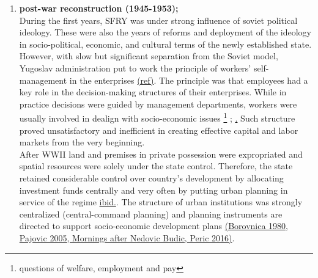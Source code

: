 \documentclass[11pt]{report}
\begin{document}
\begin{enumerate}

\item  \textbf{post-war reconstruction (1945-1953);}
\\
During the first years, SFRY was under strong influence of soviet political ideology. These were also the years of reforms and deployment of the ideology in socio-political, economic, and cultural terms of the newly established state. However, with slow but significant separation from the Soviet model, Yugoslav administration put to work the principle of workers' self-management in the enterprises \href{}{(ref)}. The principle was that employees  had  a  key  role  in  the  decision-making structures  of  their enterprises. While in practice decisions  were  guided  by  management departments,  workers were usually involved in dealign with socio-economic issues
\footnote{questions of welfare, employment and pay} \href{}{\citealt{estrin_yugoslavia:_1991}}; \href{Lydall,  1984}. Such structure proved unsatisfactory and inefficient in creating effective capital  and  labor  markets from the very beginning.
\\

After WWII land and premises in private possession were expropriated and spatial resources were solely under the state control. Therefore, the state retained considerable control over country's development by allocating investment funds centrally and very often by putting urban planning in service of the regime \href{}{ibid.}. The structure of urban institutions was strongly centralized (central-command planning) and planning instruments are directed to support socio-economic development plans \href{}{(Borovnica 1980, Pajovic 2005, Mornings after Nedovic Budic, Peric 2016)}. 


\end{enumerate}
\end{document}
